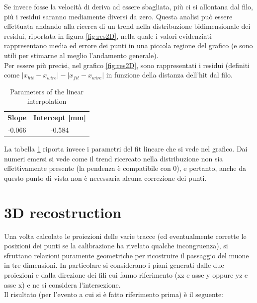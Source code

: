 \documentclass[a4paper,11pt]{book}
\begin{document}
Se invece fosse la velocità di deriva ad essere sbagliata, più ci si allontana dal filo, più i residui saranno mediamente diversi da zero. Questa analisi può essere effettuata andando alla ricerca di un trend nella distribuzione bidimensionale dei residui, riportata in figura \ref{fig:res2D}, nella quale i valori evidenziati rappresentano media ed errore dei punti in una piccola regione del grafico (e sono utili per stimarne al meglio l'andamento generale).\\ 
Per essere più precisi, nel grafico \ref{fig:res2D}, sono rappresentati i residui (definiti come $|x_{hit}-x_{wire}|-|x_{fit}-x_{wire}|$ in funzione della distanza dell'hit dal filo.\\

\begin{table}
\centering
\begin{tabular}{c  c}
\toprule
 \textbf{Slope} & \textbf{Intercept [mm]}\\
-0.066 & -0.584 \\
\bottomrule
\end{tabular}
\caption{Parameters of the linear interpolation}
\label{tab:res2D_analysis}
\end{table}


La tabella \ref{tab:res2D_analysis} riporta invece i parametri del fit lineare che si vede nel grafico. Dai numeri emersi si vede come il trend ricercato nella distribuzione non sia effettivamente presente (la pendenza è compatibile con 0), e pertanto, anche da questo punto di vista non è necessaria alcuna correzione dei punti.\\



\section{3D recostruction}

Una volta calcolate le proiezioni delle varie tracce (ed eventualmente corrette le posizioni dei punti se la calibrazione ha rivelato qualche incongruenza), si sfruttano relazioni puramente geometriche per ricostruire il passaggio del muone in tre dimensioni. In particolare si considerano i piani generati dalle due proiezioni e dalla direzione dei fili cui fanno riferimento (xz e asse y oppure yz e asse x) e ne si considera l'intersezione.\\
Il risultato (per l'evento a cui si è fatto riferimento prima) è il seguente:
\end{document}
